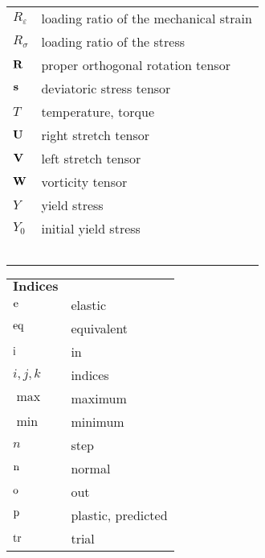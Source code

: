 \begin{table}[htb]
\begin{tabular}{p{3cm}p{10.5cm}}
    $R_{\varepsilon}$ & loading ratio of the mechanical strain \\
    $R_{\sigma}$ & loading ratio of the stress \\
    $\bf{R}$ & proper orthogonal rotation tensor \\
    $\bf{s}$ & deviatoric stress tensor \\
    $T$ & temperature, torque \\
    $\bf{U}$ & right stretch tensor \\
    $\bf{V}$ & left stretch tensor \\
    $\bf{W}$ & vorticity tensor \\
    $Y$ & yield stress \\
    $Y_0$ & initial yield stress \\
    & \\
    & \\
    & \\
    & \\
    & \\
    \end{tabular}%
  \label{Tab:latin_1}%
\end{table}%

\begin{table}[htb]
  \centering
    \begin{tabular}{p{3cm}p{10.5cm}}
    $\textbf{Indices}$ & \\
    ${\rm{e}}$  & elastic \\
    ${\rm{eq}}$  & equivalent \\
    ${\rm{i}}$  & in \\
    $i,j,k$  & indices \\
    $\max$  & maximum \\
    $\min$  & minimum \\
    $n$  & step \\
    ${\rm{n}}$  & normal \\
    ${\rm{o}}$  & out \\
    ${\rm{p}}$  & plastic, predicted \\
    ${\rm{tr}}$  & trial \\
    \end{tabular}%
  \label{Tab:indices}%
\end{table}%

